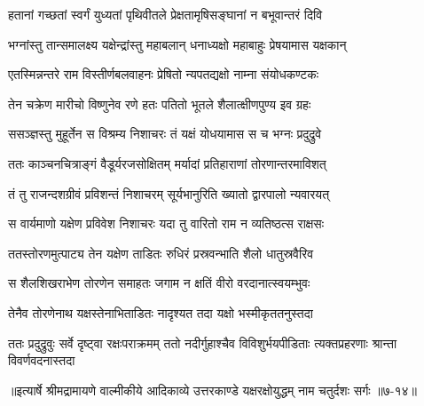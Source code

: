 \twolineshloka
{हतानां गच्छतां स्वर्गं युध्यतां पृथिवीतले}
{प्रेक्षतामृषिसङ्घानां न बभूवान्तरं दिवि} %

\twolineshloka
{भग्नांस्तु तान्समालक्ष्य यक्षेन्द्रांस्तु महाबलान्}
{धनाध्यक्षो महाबाहुः प्रेषयामास यक्षकान्} %

\twolineshloka
{एतस्मिन्नन्तरे राम विस्तीर्णबलवाहनः}
{प्रेषितो न्यपतद्यक्षो नाम्ना संयोधकण्टकः} %

\twolineshloka
{तेन चक्रेण मारीचो विष्णुनेव रणे हतः}
{पतितो भूतले शैलात्क्षीणपुण्य इव ग्रहः} %

\twolineshloka
{ससञ्ज्ञस्तु मुहूर्तेन स विश्रम्य निशाचरः}
{तं यक्षं योधयामास स च भग्नः प्रदुद्रुवे} %

\twolineshloka
{ततः काञ्चनचित्राङ्गं वैडूर्यरजसोक्षितम्}
{मर्यादां प्रतिहाराणां तोरणान्तरमाविशत्} %

\twolineshloka
{तं तु राजन्दशग्रीवं प्रविशन्तं निशाचरम्}
{सूर्यभानुरिति ख्यातो द्वारपालो न्यवारयत्} %

\twolineshloka
{स वार्यमाणो यक्षेण प्रविवेश निशाचरः}
{यदा तु वारितो राम न व्यतिष्ठत्स राक्षसः} %

\twolineshloka
{ततस्तोरणमुत्पाट्य तेन यक्षेण ताडितः}
{रुधिरं प्रस्रवन्भाति शैलो धातुस्रवैरिव} %

\twolineshloka
{स शैलशिखराभेण तोरणेन समाहतः}
{जगाम न क्षतिं वीरो वरदानात्स्वयम्भुवः} %

\twolineshloka
{तेनैव तोरणेनाथ यक्षस्तेनाभिताडितः}
{नादृश्यत तदा यक्षो भस्मीकृततनुस्तदा} %

\threelineshloka
{ततः प्रदुद्रुवुः सर्वे दृष्ट्वा रक्षःपराक्रमम्}
{ततो नदीर्गुहाश्चैव विविशुर्भयपीडिताः}
{त्यक्तप्रहरणाः श्रान्ता विवर्णवदनास्तदा} %


॥इत्यार्षे श्रीमद्रामायणे वाल्मीकीये आदिकाव्ये उत्तरकाण्डे यक्षरक्षोयुद्धम् नाम चतुर्दशः सर्गः ॥७-१४॥
